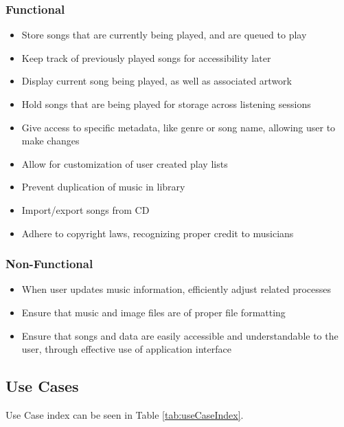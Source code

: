 \documentclass[10pt,conference,onecolumn,compsoc]{IEEEtran}
\begin{document}
\subsubsection{Functional}
\begin{itemize}
\item Store songs that are currently being played, and are queued to play
\item Keep track of previously played songs for accessibility later
\item Display current song being played, as well as associated artwork
\item Hold songs that are being played for storage across listening sessions
\item Give access to specific metadata, like genre or song name, allowing user to make changes
\item Allow for customization of user created play lists
\item Prevent duplication of music in library
\item Import/export songs from CD
\item Adhere to copyright laws, recognizing proper credit to musicians 
\end{itemize}

\subsubsection{Non-Functional}
\begin{itemize}
\item When user updates music information, efficiently adjust related processes
\item Ensure that music and image files are of proper file formatting
\item Ensure that songs and data are easily accessible and understandable to the user, through effective use of application interface
\end{itemize}

\subsection{Use Cases}
Use Case index can be seen in Table \ref{tab:useCaseIndex}.
\end{document}
